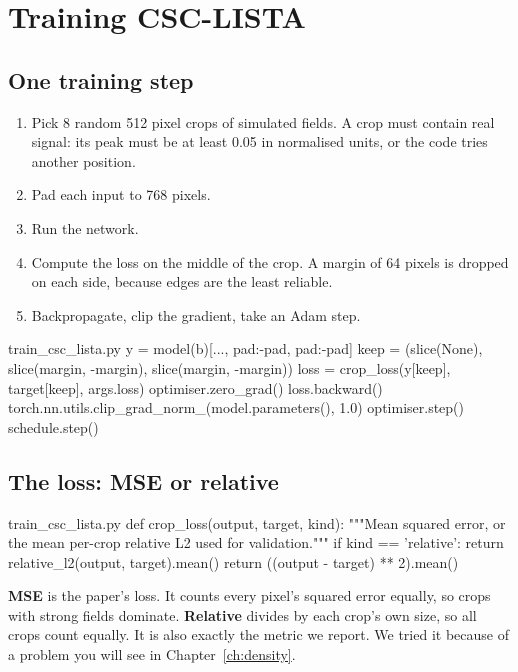 \chapter{Training CSC-LISTA}\label{ch:training}

\section{One training step}

\begin{enumerate}
\item Pick 8 random 512 pixel crops of simulated fields. A crop must contain real signal: its peak
must be at least 0.05 in normalised units, or the code tries another position.
\item Pad each input to 768 pixels.
\item Run the network.
\item Compute the loss on the middle of the crop. A margin of 64 pixels is dropped on each side,
because edges are the least reliable.
\item Backpropagate, clip the gradient, take an Adam step.
\end{enumerate}

\begin{code*}{train_csc_lista.py}
            y = model(b)[..., pad:-pad, pad:-pad]
            keep = (slice(None), slice(margin, -margin), slice(margin, -margin))
            loss = crop_loss(y[keep], target[keep], args.loss)
        optimiser.zero_grad()
        loss.backward()
        torch.nn.utils.clip_grad_norm_(model.parameters(), 1.0)
        optimiser.step()
        schedule.step()
\end{code*}

\section{The loss: MSE or relative}

\begin{code*}{train_csc_lista.py}
def crop_loss(output, target, kind):
    """Mean squared error, or the mean per-crop relative L2 used for validation."""
    if kind == 'relative':
        return relative_l2(output, target).mean()
    return ((output - target) ** 2).mean()
\end{code*}

\textbf{MSE} is the paper's loss. It counts every pixel's squared error equally, so crops with strong fields
dominate. \textbf{Relative} divides by each crop's own size, so all crops count equally. It is also exactly the
metric we report. We tried it because of a problem you will see in Chapter~\ref{ch:density}.

